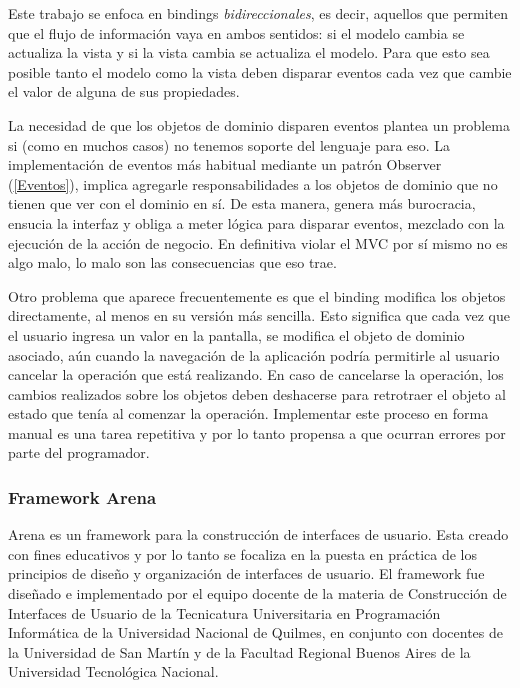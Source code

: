 	\medskip

	Este trabajo se enfoca en bindings \emph{bidireccionales}, es decir, aquellos
	que permiten que el flujo de información vaya en ambos sentidos: si el
	modelo cambia se actualiza la vista y si la vista cambia se actualiza el
	modelo.
	Para que esto sea posible tanto el modelo como la vista deben disparar eventos 
	cada vez que cambie el valor de alguna de sus propiedades.
	
	La necesidad de que los objetos de dominio disparen eventos plantea un problema
	si (como en muchos casos) no tenemos soporte del lenguaje para eso.
	La implementación de eventos más habitual mediante un patrón Observer (\ref{Eventos}), 
	implica agregarle responsabilidades a los objetos de dominio que no tienen que ver con
	el dominio en sí. De esta manera, genera más burocracia, ensucia la interfaz y
	obliga a meter lógica para disparar eventos, mezclado con la ejecución de la acción de
	negocio. En definitiva violar el MVC por sí mismo no es algo malo, lo malo son
	las consecuencias que eso trae.
	
	Otro problema que aparece frecuentemente es que el binding modifica los objetos
	directamente, al menos en su versión más sencilla. 
	Esto significa que cada vez que el usuario ingresa un valor en la pantalla,
	se modifica el objeto de dominio asociado, aún cuando la navegación de la aplicación podría
	permitirle al usuario cancelar la operación que está realizando.
	En caso de cancelarse la operación, los cambios realizados sobre los objetos
	deben deshacerse para retrotraer el objeto al estado que tenía al comenzar la
	operación. Implementar este proceso en forma manual es una tarea repetitiva y
	por lo tanto propensa a que ocurran errores por parte del programador.
	
\subsubsection{Framework Arena}
	Arena es un framework para la construcción de interfaces de usuario. 
	Esta creado con fines educativos y por lo tanto se focaliza en la puesta en
	práctica de los principios de diseño y organización de interfaces de usuario.
	El framework fue diseñado e implementado por el equipo docente de la materia de
	Construcción de Interfaces de Usuario de la Tecnicatura Universitaria en Programación
	Informática de la Universidad Nacional de Quilmes, en conjunto con docentes de
	la Universidad de San Martín y de la Facultad Regional Buenos Aires de la Universidad Tecnológica Nacional.
	
	